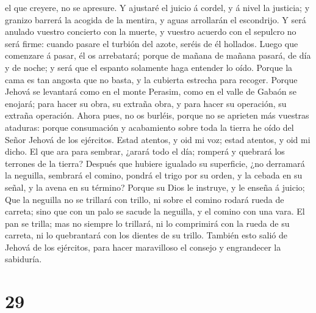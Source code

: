el que creyere, no se apresure.  Y ajustaré el juicio á
cordel, y á nivel la justicia; y granizo barrerá la acogida de la
mentira, y aguas arrollarán el escondrijo.  Y será
anulado vuestro concierto con la muerte, y vuestro acuerdo con el
sepulcro no será firme: cuando pasare el turbión del azote, seréis de él
hollados.  Luego que comenzare á pasar, él os arrebatará;
porque de mañana de mañana pasará, de día y de noche; y será que el
espanto solamente haga entender lo oído.  Porque la cama
es tan angosta que no basta, y la cubierta estrecha para recoger.
 Porque Jehová se levantará como en el monte Perasim,
como en el valle de Gabaón se enojará; para hacer su obra, su extraña
obra, y para hacer su operación, su extraña operación. 
Ahora pues, no os burléis, porque no se aprieten más vuestras ataduras:
porque consumación y acabamiento sobre toda la tierra he oído del Señor
Jehová de los ejércitos.  Estad atentos, y oid mi voz;
estad atentos, y oid mi dicho.  El que ara para sembrar,
¿arará todo el día; romperá y quebrará los terrones de la tierra?
 Después que hubiere igualado su superficie, ¿no
derramará la neguilla, sembrará el comino, pondrá el trigo por su orden,
y la cebada en su señal, y la avena en su término? 
Porque su Dios le instruye, y le enseña á juicio;  Que la
neguilla no se trillará con trillo, ni sobre el comino rodará rueda de
carreta; sino que con un palo se sacude la neguilla, y el comino con una
vara.  El pan se trilla; mas no siempre lo trillará, ni
lo comprimirá con la rueda de su carreta, ni lo quebrantará con los
dientes de su trillo.  También esto salió de Jehová de
los ejércitos, para hacer maravilloso el consejo y engrandecer la
sabiduría.

\hypertarget{section-28}{%
\section{29}\label{section-28}}

